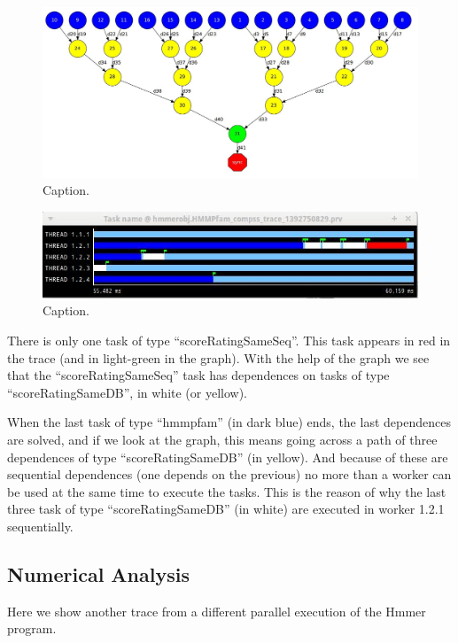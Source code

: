 \begin{figure}[ht!]
  \centering
    \includegraphics[width=1.0\textwidth]{./Sections/5_Analysis/Figures/9.jpeg}
    \caption{Caption.}
\end{figure}

\begin{figure}[ht!]
  \centering
    \includegraphics[width=1.0\textwidth]{./Sections/5_Analysis/Figures/10.jpeg}
    \caption{Caption.}
\end{figure}

There is only one task of type ``scoreRatingSameSeq''. This task appears in red in the trace 
(and in light-green in the graph). With the help of the graph we see that the ``scoreRatingSameSeq'' 
task has dependences on tasks of type ``scoreRatingSameDB'', in white (or yellow).

When the last task of type ``hmmpfam'' (in dark blue) ends, the last dependences are solved, 
and if we look at the graph, this means going across a path of three dependences of type 
``scoreRatingSameDB'' (in yellow). And because of these are sequential dependences (one depends 
on the previous) no more than a worker can be used at the same time to execute the tasks. 
This is the reason of why the last three task of type ``scoreRatingSameDB'' (in white) are 
executed in worker 1.2.1 sequentially.

\subsection{Numerical Analysis}
Here we show another trace from a different parallel execution of the Hmmer program.
 
